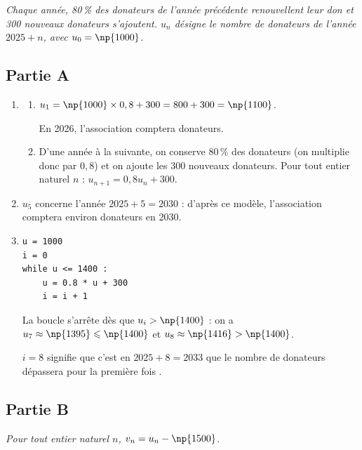 \emph{Chaque année, 80\,\% des donateurs de l'année précédente renouvellent leur don et
300 nouveaux donateurs s'ajoutent. $u_n$ désigne le nombre de donateurs de l'année
$2025 + n$, avec $u_0 = \np{1000}$.}

\subsection*{Partie A}

\begin{enumerate}
	\item
	\begin{enumerate}
		\item $u_1 = \np{1000} \times 0,8 + 300 = 800 + 300 = \np{1100}$.

		En 2026, l'association comptera  donateurs.

		\item D'une année à la suivante, on conserve 80\,\% des donateurs (on multiplie donc par $0,8$)
		et on ajoute les 300 nouveaux donateurs. Pour tout entier naturel $n$ :
		$u_{n+1} = 0,8u_n + 300$.
	\end{enumerate}

	\item $u_5$ concerne l'année $2025 + 5 = 2030$ : d'après ce modèle, l'association comptera environ  donateurs en 2030.

	\item
	\begin{lstlisting}[style=python,xleftmargin=4.5cm,xrightmargin=4.5cm,numbers=none]
u = 1000
i = 0
while u <= 1400 :
    u = 0.8 * u + 300
    i = i + 1
\end{lstlisting}

	La boucle s'arrête dès que $u_i > \np{1400}$ : on a $u_7 \approx \np{1395} \leqslant \np{1400}$ et $u_8 \approx \np{1416} > \np{1400}$.

	$i = 8$ signifie que c'est en
	$2025 + 8 = 2033$ que le nombre de donateurs dépassera pour la première fois
	.
\end{enumerate}

\subsection*{Partie B}

\emph{Pour tout entier naturel $n$, $v_n = u_n - \np{1500}$.}

